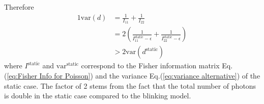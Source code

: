 Therefore
%
\begin{alignat}{1}
	\text{var}(d) & =\frac{1}{I_{11}}+\frac{1}{I_{22}}\nonumber \\
	& =2\left(\frac{1}{I_{11}^{\text{static}}-\epsilon}+\frac{1}{I_{22}^{\text{static}}-\epsilon}\right)\nonumber \\
	 & >2\text{var}(d^{\text{static}})\label{eq:variance d static vs blinking}
\end{alignat}
%
where $I^{\text{static}}$ and $\text{var}^{\text{static}}$ correspond to the Fisher information matrix Eq.(\ref{eq:Fisher Info for Poisson}) and the variance Eq.(\ref{eq:variance alternative}) of the static case. The factor of 2 stems from the fact that the total number of photons is double in the static case compared to the blinking model. 